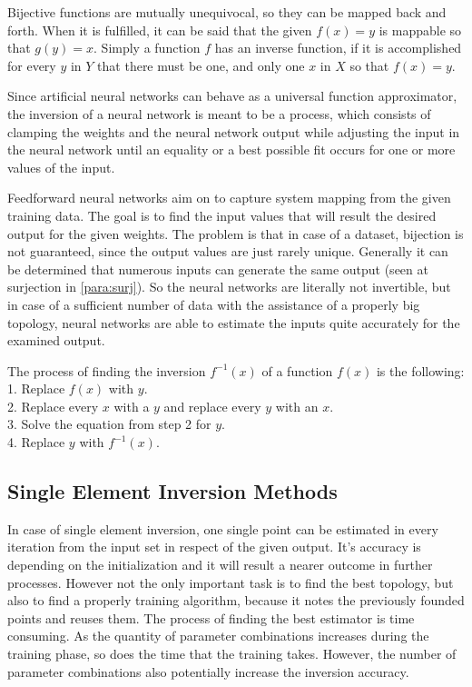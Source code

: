Bijective functions are mutually unequivocal, so they can be mapped back and forth. When it is fulfilled, it can be said that the given $f(x) = y$ is mappable so that $g(y) = x$. Simply a function $f$ has an inverse function, if it is accomplished for every $y$ in $Y$ that there must be one, and only one $x$ in $X$ so that $f(x) = y$.\bigskip

Since artificial neural networks can behave as a universal function approximator, the inversion of a neural network is meant to be a process, which consists of clamping the weights and the neural network output while adjusting the input in the neural network until an equality or a best possible fit occurs for one or more values of the input. \medskip

Feedforward neural networks aim on to capture system mapping from the given training data. The goal is to find the input values that will result the desired output for the given weights. The problem is that in case of a dataset, bijection is not guaranteed, since the output values are just rarely unique. Generally it can be determined that numerous inputs can generate the same output (seen at surjection in \ref{para:surj}). So the neural networks are literally not invertible, but in case of a sufficient number of data with the assistance of a properly big topology, neural networks are able to estimate the inputs quite accurately for the examined output.

\bigskip \noindent The process of finding the inversion $f^{-1}(x)$ of a function $f(x)$ is the following:\\
1. Replace $f(x)$ with $y$.\\
2. Replace every $x$ with a $y$ and replace every $y$ with an $x$. \\
3. Solve the equation from step 2 for $y$. \\
4. Replace $y$ with $f^{-1}(x)$. 



\subsection{Single Element Inversion Methods}

In case of single element inversion, one single point can be estimated in every iteration from the input set in respect of the given output. It's accuracy is depending on the initialization and it will result a nearer outcome in further processes. However not the only important task is to find the best topology, but also to find a properly training algorithm, because it notes the previously founded points and reuses them. The process of finding the best estimator is time consuming. As the quantity of parameter combinations increases during the training phase, so does the time that the training takes. However, the number of parameter combinations also potentially increase the inversion accuracy.\bigskip

